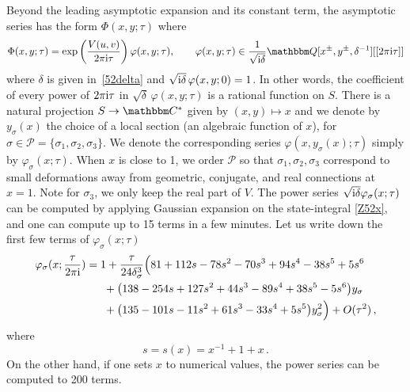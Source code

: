 \documentclass[12pt,reqno]{amsart}
\theoremstyle{definition}
\def\BQ{\mathbbm Q}
\def\BC{\mathbbm C}
\def\calP{\mathcal P}
\def\s{\sigma}
\def\ri{\mathrm{i}}
\def\ri{{\rm i}}
\def\mc{\mathcal}
\newcommand{\nn}{\nonumber \\}
\begin{document}
Beyond the leading asymptotic expansion and its constant term, the
asymptotic series has the form $\Phi(x,y;\tau)$ where 
\begin{equation}
  \label{Phi52}
  \Phi(x,y;\tau)=\exp\left( { V(u,v) \over 2\pi\ri \tau} \right)
  \varphi(x,y;\tau),
  \qquad 
  \varphi(x,y;\tau) \in \frac{1}{\sqrt{\ri\delta}}
  \BQ[x^\pm,y^\pm,\delta^{-1}] [[2 \pi \ri \tau]]
\end{equation}
where $\delta$ is given in~\eqref{52delta} and
$\sqrt{\ri \delta} \, \varphi(x,y;0)=1$.  In other words, the
coefficient of every power of $2\pi \ri \tau$ in
$\sqrt{\delta} \, \varphi(x,y;\tau)$ is a rational function on
$S$. There is a natural projection $S \to \BC^*$ given by
$(x,y) \mapsto x$ and we denote by $y_\s(x)$ the choice of a local
section (an algebraic function of $x$), for
$\s \in \calP=\{\s_1,\s_2,\s_3\}$.  We denote the corresponding series
$\varphi(x,y_\s(x);\tau)$ simply by $\varphi_\s(x;\tau)$.  When $x$ is
close to 1, we order $\mc{P}$ so that $\s_1,\s_2,\s_3$ correspond to
small deformations away from geometric, conjugate, and real
connections at $x=1$.  Note for $\s_3$, we only keep the real part of
$V$. The power series $\sqrt{\ri\delta}\varphi_\s(x;\tau)$ can be
computed by applying Gaussian expansion on the state-integral
\eqref{Z52x}, and one can compute up to 15 terms in a few minutes.
Let us write down the first few terms of
$\varphi_\s(x;\tau)$
\begin{align}
  &\varphi_\s(x;\frac{\tau}{2\pi\ri})=
    1  +\frac{\tau}{24\delta_\s^3}\Big(
    81+112s-78s^2-70s^3+94s^4-38s^5+5s^6\nn
  &\phantom{========}+\big(138-254s+127s^2+44s^3-89s^4+38s^5-5s^6
    \big)y_\s\nn
  &\phantom{========}+\big(
    135-101s-11s^2+61s^3-33s^4+5s^5
    \big)y_\s^2 \Big)
    +O(\tau^2)\,,
    \label{eq:vf-52}
\end{align}
where
\begin{equation}
  s = s(x) = x^{-1}+1 +x\,.
\end{equation}
On the other hand, if one sets $x$ to numerical values, the power
series can be computed to 200 terms.
\end{document}
